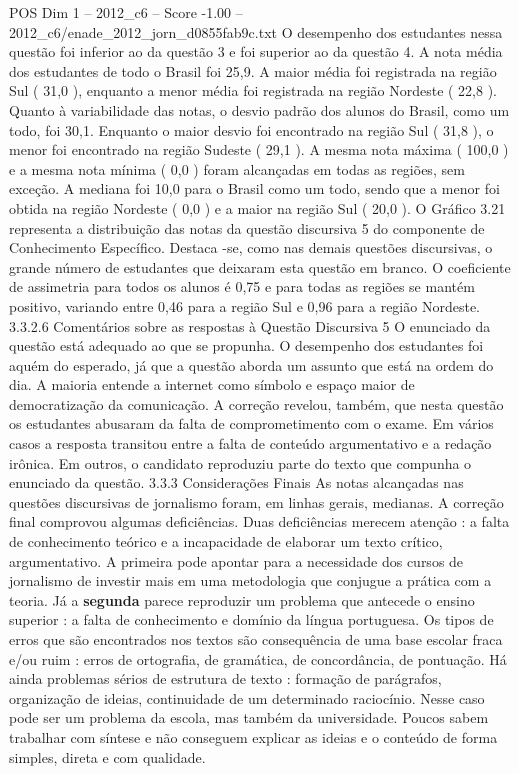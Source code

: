 \begin{textsample}{POS Dim 1 – 2012\_c6 – Score -1.00 – 2012\_c6/enade\_2012\_jorn\_d0855fab9c.txt}
O desempenho dos estudantes nessa questão foi inferior ao da questão 3 e foi superior ao da questão 4.
A nota média dos estudantes de todo o Brasil foi 25,9.
A maior média foi registrada na região Sul ( 31,0 ), enquanto a menor média foi registrada na região Nordeste ( 22,8 ).
Quanto à variabilidade das notas, o desvio padrão dos alunos do Brasil, como um todo, foi 30,1.
Enquanto o maior desvio foi encontrado na região Sul ( 31,8 ), o menor foi encontrado na região Sudeste ( 29,1 ).
A mesma nota máxima ( 100,0 ) e a mesma nota mínima ( 0,0 ) foram alcançadas em todas as regiões, sem exceção.
A mediana foi 10,0 para o Brasil como um todo, sendo que a menor foi obtida na região Nordeste ( 0,0 ) e a maior na região Sul ( 20,0 ).
O Gráfico 3.21 representa a distribuição das notas da questão discursiva 5 do componente de Conhecimento Específico.
Destaca -se, como nas demais questões discursivas, o grande número de estudantes que deixaram esta questão em branco.
O coeficiente de assimetria para todos os alunos é 0,75 e para todas as regiões se mantém positivo, variando entre 0,46 para a região Sul e 0,96 para a região Nordeste. 3.3.2.6 Comentários sobre as respostas à Questão Discursiva 5 O enunciado da questão está adequado ao que se propunha.
O desempenho dos estudantes foi aquém do esperado, já que a questão aborda um assunto que está na ordem do dia.
A maioria entende a internet como símbolo e espaço maior de democratização da comunicação.
A correção revelou, também, que nesta questão os estudantes abusaram da falta de comprometimento com o exame.
Em vários casos a resposta transitou entre a falta de conteúdo argumentativo e a redação irônica.
Em outros, o candidato reproduziu parte do texto que compunha o enunciado da questão. 3.3.3 Considerações Finais As notas alcançadas nas questões discursivas de jornalismo foram, em linhas gerais, medianas.
A correção final comprovou algumas deficiências.
Duas deficiências merecem atenção : a falta de conhecimento teórico e a incapacidade de elaborar um texto crítico, argumentativo.
A primeira pode apontar para a necessidade dos cursos de jornalismo de investir mais em uma metodologia que conjugue a prática com a teoria.
Já a \textbf{segunda} parece reproduzir um problema que antecede o ensino superior : a falta de conhecimento e domínio da língua portuguesa.
Os tipos de erros que são encontrados nos textos são consequência de uma base escolar fraca e/ou ruim : erros de ortografia, de gramática, de concordância, de pontuação.
Há ainda problemas sérios de estrutura de texto : formação de parágrafos, organização de ideias, continuidade de um determinado raciocínio.
Nesse caso pode ser um problema da escola, mas também da universidade.
Poucos sabem trabalhar com síntese e não conseguem explicar as ideias e o conteúdo de forma simples, direta e com qualidade.

\end{textsample}
